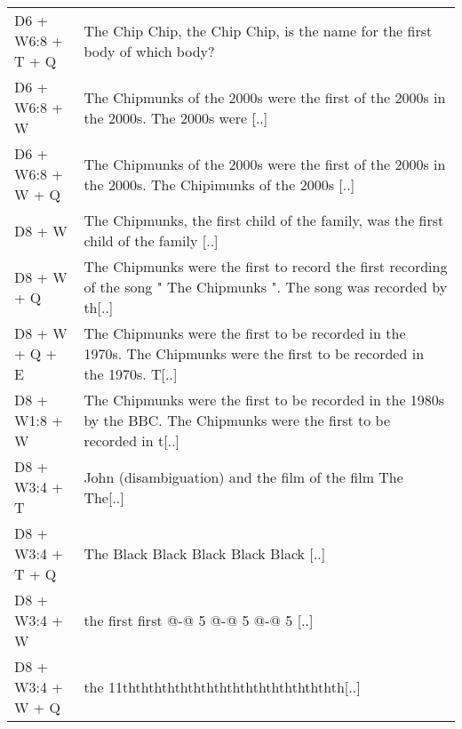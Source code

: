 {\begin{longtable}{lp{8cm}}
D6 + W6:8 + T + Q & The Chip Chip, the Chip Chip, is the name for the first body of which body? \\
D6 + W6:8 + W & The Chipmunks of the 2000s were the first of the 2000s in the 2000s. The 2000s were [..] \\
D6 + W6:8 + W + Q & The Chipmunks of the 2000s were the first of the 2000s in the 2000s. The Chipimunks of the 2000s [..] \\
D8 + W & The Chipmunks, the first child of the family, was the first child of the family [..] \\
D8 + W + Q & The Chipmunks were the first to record the first recording of the song " The Chipmunks ". The song was recorded by th[..] \\
D8 + W + Q + E & The Chipmunks were the first to be recorded in the 1970s. The Chipmunks were the first to be recorded in the 1970s. T[..] \\
D8 + W1:8 + W & The Chipmunks were the first to be recorded in the 1980s by the BBC. The Chipmunks were the first to be recorded in t[..] \\
D8 + W3:4 + T & John (disambiguation) and the film of the film The The[..] \\
D8 + W3:4 + T + Q & The Black Black Black Black Black [..] \\
D8 + W3:4 + W & the first first @-@ 5 @-@ 5 @-@ 5 [..] \\
D8 + W3:4 + W + Q & the 11ththththththththththththththththth[..] \\

\end{longtable}
}
\normalsize
